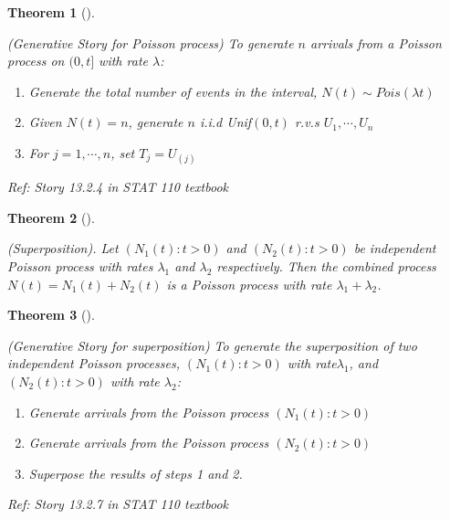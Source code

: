 \documentclass[
  letterpaper,
  DIV=11,
  numbers=noendperiod]{scrreprt}
\theoremstyle{plain}
\newtheorem{theorem}{Theorem}[chapter]
\theoremstyle{definition}
\theoremstyle{remark}
\begin{document}
\leavevmode{}%
\begin{theorem}[]\label{thm-poisson-story}

(Generative Story for Poisson process) To generate \(n\) arrivals from a
Poisson process on \((0, t]\) with rate \(\lambda\):

\begin{enumerate}
\def\labelenumi{\arabic{enumi}.}
\item
  Generate the total number of events in the interval,
  \(N(t) \sim Pois(\lambda t)\)
\item
  Given \(N(t) = n\), generate \(n\) i.i.d Unif\((0,t)\) r.v.s
  \(U_1, \cdots, U_n\)
\item
  For \(j=1, \cdots, n\), set \(T_j = U_{(j)}\)
\end{enumerate}

\emph{Ref: Story 13.2.4 in STAT 110 textbook}

\end{theorem}

\leavevmode{}%
\begin{theorem}[]\label{thm-superposition}

(Superposition). Let \((N_1(t): t>0)\) and \((N_2(t): t>0)\) be
independent Poisson process with rates \(\lambda_1\) and \(\lambda_2\)
respectively. Then the combined process \(N(t) = N_1(t) + N_2(t)\) is a
Poisson process with rate \(\lambda_1+\lambda_2\).

\end{theorem}

\leavevmode{}%
\begin{theorem}[]\label{thm-poisson-story-superposition}

(Generative Story for superposition) To generate the superposition of
two independent Poisson processes, \((N_1(t): t>0)\) with
rate\(\lambda_1\), and \((N_2(t): t>0)\) with rate \(\lambda_2\):

\begin{enumerate}
\def\labelenumi{\arabic{enumi}.}
\item
  Generate arrivals from the Poisson process \((N_1(t): t>0)\)
\item
  Generate arrivals from the Poisson process \((N_2(t): t>0)\)
\item
  Superpose the results of steps 1 and 2.
\end{enumerate}

\emph{Ref: Story 13.2.7 in STAT 110 textbook}

\end{theorem}
\end{document}
